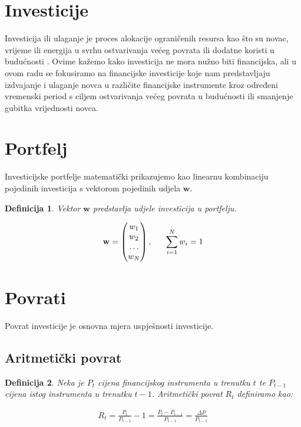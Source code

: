 \documentclass[zavrsnirad, upload]{fer}
\newtheorem{definition}{Definicija}
\begin{document}
\section{Investicije}
\label{sek:investicije}
Investicija ili ulaganje je proces alokacije ograničenih resursa
kao što su novac, vrijeme ili energija u svrhu ostvarivanja
većeg povrata ili dodatne koristi u budućnosti \cite{Investments}.
Ovime kažemo kako investicija ne mora nužno biti financijska,
ali u ovom radu se fokusiramo na financijske investicije koje nam
predstavljaju izdvajanje i ulaganje novca u različite financijske instrumente
kroz određeni vremenski period s ciljem ostvarivanja većeg povrata
u budućnosti ili smanjenje gubitka vrijednosti novca.

\section{Portfelj}
\label{sek:portfelj}
Investicijske portfelje matematički prikazujemo kao linearnu kombinaciju
pojedinih investicija s vektorom pojedinih udjela $\mathbf{w}$.
\begin{definition}
	Vektor $\mathbf{w}$ predstavlja udjele investicija u portfelju.
\end{definition}
\begin{align}
	\mathbf{w} = \begin{pmatrix} w_1 \\ w_2 \\ \dots \\ w_N \end{pmatrix},
	\indent \sum_{i = 1}^{N} w_i = 1
\end{align}

\section{Povrati}
\label{sek:povrati}
Povrat investicije je osnovna mjera uspješnosti investicije.
\subsection{Aritmetički povrat}

\begin{definition}
	Neka je $P_t$ cijena financijskog instrumenta u trenutku $t$ te
    $P_{t-1}$ cijena istog instrumenta u trenutku $t-1$. Aritmetički povrat
    $R_t$ definiramo kao:
\end{definition}
\begin{align}R_t = \frac{P_t}{P_{t-1}} - 1 =
    \frac{P_t - P_{t-1}}{P_{t-1}} =
\frac{\Delta P}{P_{t-1}}
\end{align}
\end{document}

